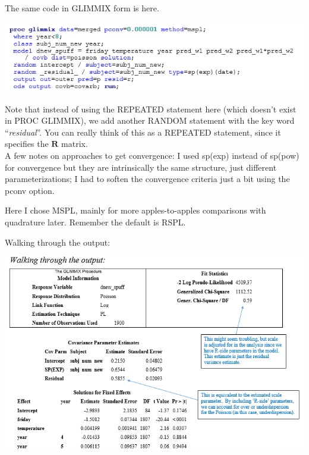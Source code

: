 \documentclass[
  9pt,
  ignorenonframetext,
]{beamer}
\begin{document}
\begin{frame}{The same code in GLIMMIX form is here.}
\protect\hypertarget{the-same-code-in-glimmix-form-is-here.}{}
\begin{center}\includegraphics[width=0.7\linewidth]{figs_L16/f2} \end{center}

Note that instead of using the REPEATED statement here (which doesn't
exist in PROC GLIMMIX), we add another RANDOM statement with the key
word ``\emph{residual}''. You can really think of this as a REPEATED
statement, since it specifies the \(\pmb R\) matrix.\\
A few notes on approaches to get convergence: I used sp(exp) instead of
sp(pow) for convergence but they are intrinsically the same structure,
just different parameterizations; I had to soften the convergence
criteria just a bit using the pconv option.

Here I chose MSPL, mainly for more apples-to-apples comparisons with
quadrature later. Remember the default is RSPL.
\end{frame}

\begin{frame}{Walking through the output:}
\protect\hypertarget{walking-through-the-output}{}
\begin{center}\includegraphics[width=0.7\linewidth]{figs_L16/f3} \end{center}
\end{frame}
\end{document}
